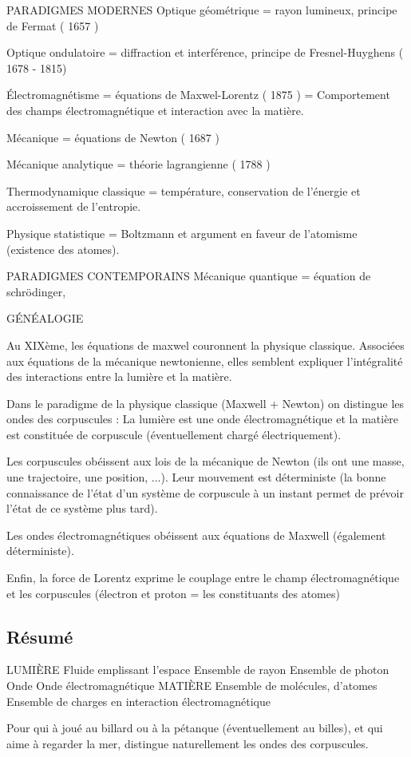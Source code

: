 \begin{comment}
\end{comment}

PARADIGMES MODERNES
	Optique géométrique = rayon lumineux, principe de Fermat ( 1657 )

	Optique ondulatoire = diffraction et interférence, principe de Fresnel-Huyghens ( 1678 - 1815)

	Électromagnétisme =  équations de Maxwel-Lorentz ( 1875 ) = Comportement des champs électromagnétique et interaction avec la matière.

	Mécanique = équations de Newton ( 1687 )

	Mécanique analytique = théorie lagrangienne ( 1788 )

	Thermodynamique classique = température, conservation de l'énergie et accroissement de l'entropie.

	Physique statistique = Boltzmann et argument en faveur de l'atomisme (existence des atomes).


PARADIGMES CONTEMPORAINS
	Mécanique quantique = équation de schrödinger, 

GÉNÉALOGIE

Au XIXème, les équations de maxwel couronnent la physique classique. Associées aux équations de la mécanique newtonienne, elles semblent expliquer l'intégralité des interactions entre la lumière et la matière.

Dans le paradigme de la physique classique (Maxwell + Newton) on distingue les ondes des corpuscules : La lumière est une onde électromagnétique et la matière est constituée de corpuscule (éventuellement chargé électriquement).

Les corpuscules obéissent aux lois de la mécanique de Newton (ils ont une masse, une trajectoire, une position, ...). Leur mouvement est déterministe (la bonne connaissance de l'état d'un système de corpuscule à un instant permet de prévoir l'état de ce système plus tard).

Les ondes électromagnétiques obéissent aux équations de Maxwell (également déterministe).

Enfin, la force de Lorentz exprime le couplage entre le champ électromagnétique et les corpuscules (électron et proton = les constituants des atomes)




\subsection{Résumé}

LUMIÈRE
	Fluide emplissant l'espace
	Ensemble de rayon
	Ensemble de photon
	Onde
	Onde électromagnétique
MATIÈRE
	Ensemble de molécules, d'atomes
	Ensemble de charges en interaction électromagnétique
	

Pour qui à joué au billard ou à la pétanque (éventuellement au billes), et qui aime à regarder la mer, distingue naturellement les ondes des corpuscules.


\subsection{}
\begin{center}
\end{center}

